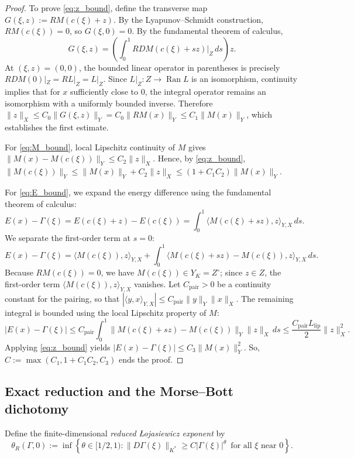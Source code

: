 \documentclass[11pt]{article}
\theoremstyle{definition}
\theoremstyle{remark}
\begin{document}
\begin{proof}
To prove \eqref{eq:z_bound}, define the transverse map $G(\xi,z) := R M(c(\xi)+z)$. By the Lyapunov--Schmidt construction, $R M(c(\xi)) = 0$, so $G(\xi,0) = 0$. By the fundamental theorem of calculus,
$$G(\xi,z) = \left( \int_0^1 R DM(c(\xi)+sz)|_Z \, ds \right) z. $$
At $(\xi,z) = (0,0)$, the bounded linear operator in parentheses is precisely $R DM(0)|_Z = R L|_Z = L|_Z$. Since $L|_Z \colon Z \to \operatorname{Ran} L$ is an isomorphism, continuity implies that for $x$ sufficiently close to $0$, the integral operator remains an isomorphism with a uniformly bounded inverse. Therefore $\|z\|_X\le C_0\|G(\xi,z)\|_Y=C_0\|RM(x)\|_Y\le C_1\|M(x)\|_Y$, which establishes the first estimate.

For \eqref{eq:M_bound}, local Lipschitz continuity of $M$ gives $\|M(x)-M(c(\xi))\|_Y\le C_2\|z\|_X$. Hence, by \eqref{eq:z_bound}, $\|M(c(\xi))\|_Y\le\|M(x)\|_Y+C_2\|z\|_X\le(1+C_1C_2)\|M(x)\|_Y$.

\smallskip
For \eqref{eq:E_bound}, we expand the energy difference using the fundamental theorem of calculus:
$$E(x) - \Gamma(\xi) = E(c(\xi)+z) - E(c(\xi)) = \int_0^1 \langle M(c(\xi)+sz), z \rangle_{Y,X} \, ds. $$
We separate the first-order term at $s=0$:
$$E(x) - \Gamma(\xi) = \langle M(c(\xi)), z \rangle_{Y,X} + \int_0^1 \langle M(c(\xi)+sz) - M(c(\xi)), z \rangle_{Y,X} \, ds.  $$
Because $RM(c(\xi))=0$, we have $M(c(\xi))\in Y_K=Z^\circ$; since $z\in Z$, the first-order term $\langle M(c(\xi)),z\rangle_{Y,X}$ vanishes.
Let $C_{\mathrm{pair}}>0$ be a continuity constant for the pairing, so that
$|\langle y,x\rangle_{Y,X}|\le C_{\mathrm{pair}}\|y\|_Y\|x\|_X$.
The remaining integral is bounded using the local Lipschitz property of $M$:
$$|E(x) - \Gamma(\xi)| \le C_{\mathrm{pair}}\int_0^1 \|M(c(\xi)+sz) - M(c(\xi))\|_Y \|z\|_X \, ds
\le \frac{C_{\mathrm{pair}}L_{\mathrm{lip}}}{2} \|z\|_X^2.  $$
Applying \eqref{eq:z_bound} yields $|E(x) - \Gamma(\xi)| \le C_3 \|M(x)\|_Y^2$. So, $C := \max(C_1, 1+C_1 C_2, C_3)$ ends the proof.
\end{proof}

\subsection{Exact reduction and the Morse--Bott dichotomy}

Define the finite-dimensional \emph{reduced \L{}ojasiewicz exponent} by
$$\theta_R(\Gamma,0) := \inf \left\{ \theta \in [1/2,1) : \|D\Gamma(\xi)\|_{K^*} \ge C|\Gamma(\xi)|^{\theta} \,  \text{ for all $\xi$ near } 0 \right\}. $$
\end{document}
